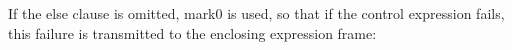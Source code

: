 \begin{center}
\tabletail{}
\tablelasttail{}
\begin{supertabular}{|m{1.9073598in}|m{2.75596in}|}

\end{supertabular}
\end{center}

If the else clause is omitted, mark0 is used, so that if the control
expression fails, this failure is transmitted to the enclosing
expression frame:

